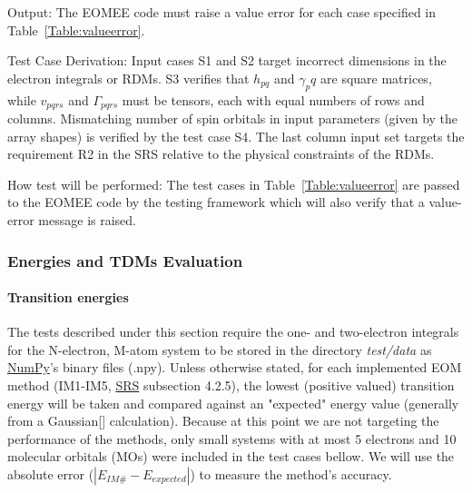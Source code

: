 \documentclass[12pt, titlepage]{article}
\begin{document}
\begin{enumerate}
Output: The EOMEE code must raise a value error for each case specified in 
Table~\ref{Table:valueerror}.

Test Case Derivation: Input cases S1 and S2 target incorrect dimensions in the 
electron integrals or RDMs. S3 verifies that $h_{pq}$ and $\gamma_pq$ are 
square matrices, while $v_{pqrs}$ and $\Gamma_{pqrs}$ must be tensors, each 
with equal numbers of rows and columns. Mismatching number of spin orbitals in 
input parameters (given by the array shapes) is verified by the test case S4. 
The last column input set targets the requirement R2 in the SRS relative to the 
physical constraints of the RDMs.

How test will be performed: The test cases in Table~\ref{Table:valueerror} are 
passed to the EOMEE code by the testing framework which will also verify that a 
value-error message is raised.

\end{enumerate}

\subsubsection{Energies and TDMs Evaluation}
\label{section:calculations}

\paragraph{Transition energies\\}

The tests described under this section require the one- and 
two-electron integrals for the N-electron, M-atom system to be stored in the 
directory \textit{test/data} as \href{https://numpy.org/} {NumPy}'s binary 
files (.npy). Unless otherwise 
stated, for each implemented EOM method (IM1-IM5, 
\href{https://github.com/gabrielasd/eomee/tree/cas741/docs/SRS} {SRS} 
subsection 4.2.5), the lowest (positive valued) 
transition energy will be taken and compared against an "expected" energy value 
(generally from a Gaussian[\cite{g16}] calculation). 
Because at this point we are not targeting the performance of the 
methods, only small systems with at most 5 electrons and 10 molecular orbitals 
(MOs) 
were included in the test cases bellow. We will use the absolute error 
($|E_{IM\#} - E_{expected}|$) to measure the method's accuracy.
\end{document}
